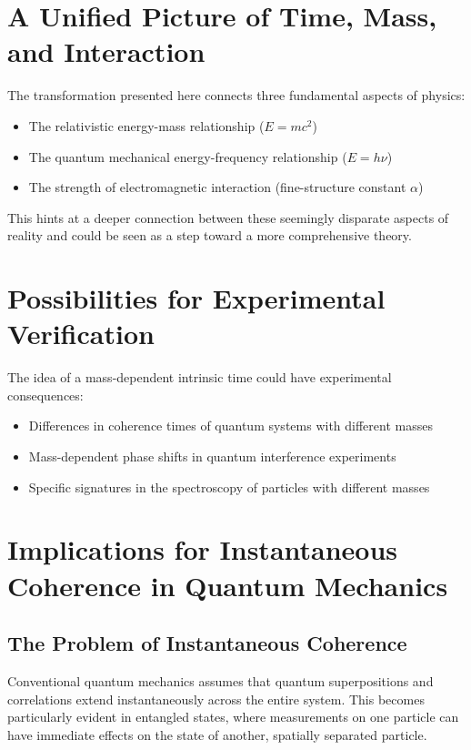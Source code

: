\documentclass{article}
\begin{document}
	\section{A Unified Picture of Time, Mass, and Interaction}
	
	The transformation presented here connects three fundamental aspects of physics:
	\begin{itemize}
		\item The relativistic energy-mass relationship ($E = mc^2$)
		\item The quantum mechanical energy-frequency relationship ($E = h\nu$)
		\item The strength of electromagnetic interaction (fine-structure constant $\alpha$)
	\end{itemize}
	
	This hints at a deeper connection between these seemingly disparate aspects of reality and could be seen as a step toward a more comprehensive theory.
	
	\section{Possibilities for Experimental Verification}
	
	The idea of a mass-dependent intrinsic time could have experimental consequences:
	\begin{itemize}
		\item Differences in coherence times of quantum systems with different masses
		\item Mass-dependent phase shifts in quantum interference experiments
		\item Specific signatures in the spectroscopy of particles with different masses
	\end{itemize}
	
	\section{Implications for Instantaneous Coherence in Quantum Mechanics}
	
	\subsection{The Problem of Instantaneous Coherence}
	
	Conventional quantum mechanics assumes that quantum superpositions and correlations extend instantaneously across the entire system. This becomes particularly evident in entangled states, where measurements on one particle can have immediate effects on the state of another, spatially separated particle.
	
\end{document}
